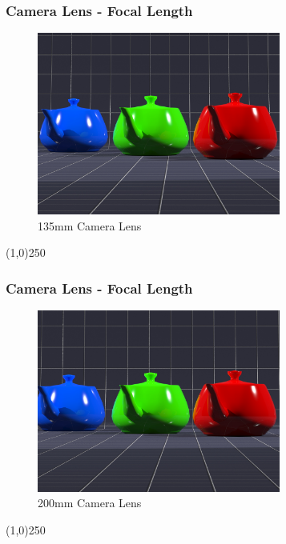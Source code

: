 \begin{frame}
\frametitle{Camera Lens - Focal Length}
\begin{figure}
	\centering
	\includegraphics[height=6cm]{img/Camras/135mm.jpg}
	\caption[135mm Camera Lens]{135mm Camera Lens}
	\label{fig:135mm}
\end{figure}
\end{frame}
\begin{center}\line(1,0){250}\end{center}


\begin{frame}
\frametitle{Camera Lens - Focal Length}
\begin{figure}
	\centering
	\includegraphics[height=6cm]{img/Camras/200mm.jpg}
	\caption[200mm Camera Lens]{200mm Camera Lens}
	\label{fig:200mm}
\end{figure}
\end{frame}
\begin{center}\line(1,0){250}\end{center}



